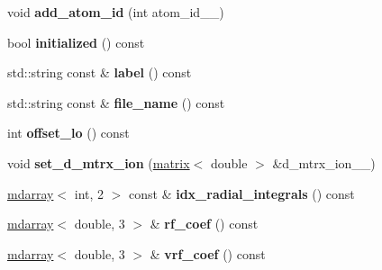 \begin{DoxyCompactItemize}
\item 
\hypertarget{classsirius_1_1_atom__type_a1e908a3f250be0c56da238e3ee143935}{}void {\bfseries add\+\_\+atom\+\_\+id} (int atom\+\_\+id\+\_\+\+\_\+)\label{classsirius_1_1_atom__type_a1e908a3f250be0c56da238e3ee143935}

\item 
\hypertarget{classsirius_1_1_atom__type_ab003d12f2c4784d631c52283653cef85}{}bool {\bfseries initialized} () const \label{classsirius_1_1_atom__type_ab003d12f2c4784d631c52283653cef85}

\item 
\hypertarget{classsirius_1_1_atom__type_a7019035527634f5e6be702fa97f59e51}{}std\+::string const \& {\bfseries label} () const \label{classsirius_1_1_atom__type_a7019035527634f5e6be702fa97f59e51}

\item 
\hypertarget{classsirius_1_1_atom__type_af6f88c2012a4d8537145855625573d65}{}std\+::string const \& {\bfseries file\+\_\+name} () const \label{classsirius_1_1_atom__type_af6f88c2012a4d8537145855625573d65}

\item 
\hypertarget{classsirius_1_1_atom__type_ae9aad73631f026aaf2fd36b72485757a}{}int {\bfseries offset\+\_\+lo} () const \label{classsirius_1_1_atom__type_ae9aad73631f026aaf2fd36b72485757a}

\item 
\hypertarget{classsirius_1_1_atom__type_a6245ba04e8d044cd00ed8c2e96bc0487}{}void {\bfseries set\+\_\+d\+\_\+mtrx\+\_\+ion} (\hyperlink{classsddk_1_1mdarray}{matrix}$<$ double $>$ \&d\+\_\+mtrx\+\_\+ion\+\_\+\+\_\+)\label{classsirius_1_1_atom__type_a6245ba04e8d044cd00ed8c2e96bc0487}

\item 
\hypertarget{classsirius_1_1_atom__type_a90054e64883c4a0829c2100f3b0bbfbe}{}\hyperlink{classsddk_1_1mdarray}{mdarray}$<$ int, 2 $>$ const \& {\bfseries idx\+\_\+radial\+\_\+integrals} () const \label{classsirius_1_1_atom__type_a90054e64883c4a0829c2100f3b0bbfbe}

\item 
\hypertarget{classsirius_1_1_atom__type_a60082f95414ac9949ee61de740b74864}{}\hyperlink{classsddk_1_1mdarray}{mdarray}$<$ double, 3 $>$ \& {\bfseries rf\+\_\+coef} () const \label{classsirius_1_1_atom__type_a60082f95414ac9949ee61de740b74864}

\item 
\hypertarget{classsirius_1_1_atom__type_aa88b23b1dbe45f6e5d6e67458885a69a}{}\hyperlink{classsddk_1_1mdarray}{mdarray}$<$ double, 3 $>$ \& {\bfseries vrf\+\_\+coef} () const \label{classsirius_1_1_atom__type_aa88b23b1dbe45f6e5d6e67458885a69a}


\end{DoxyCompactItemize}
